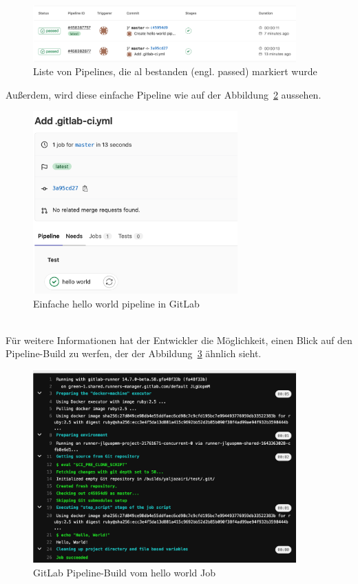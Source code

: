 \begin{figure}[!htbp]%
	\centering
	\includegraphics[width=0.9\textwidth]{Graphics/GitLab-passed_pipeline.png}
	\caption{Liste von Pipelines, die al bestanden (engl. passed) markiert wurde}
	\label{fig:GitLabPipeLinePassed}
\end{figure}
 
\pagebreak
Außerdem, wird diese einfache Pipeline wie auf der Abbildung~\ref{fig:GitLabHelloWorldPipeline} aussehen.

\begin{figure}[!htbp]%
	\centering
	\includegraphics[width=0.7\textwidth]{Graphics/GitLab-helloWorld_pipeline.png}
	\caption{Einfache hello world pipeline in GitLab}
	\label{fig:GitLabHelloWorldPipeline}
\end{figure}
\ \\
Für weitere Informationen hat der Entwickler die Möglichkeit, einen Blick auf den Pipeline-Build zu werfen, der der Abbildung~\ref{fig:GitLabPipelineBuild} ähnlich sieht.

\pagebreak
\begin{figure}[!htbp]%
	\centering
	\includegraphics[width=0.9\textwidth]{Graphics/GitLab-pipeline-job-build.png}
	\caption{GitLab Pipeline-Build vom hello world Job}
	\label{fig:GitLabPipelineBuild}
\end{figure}

